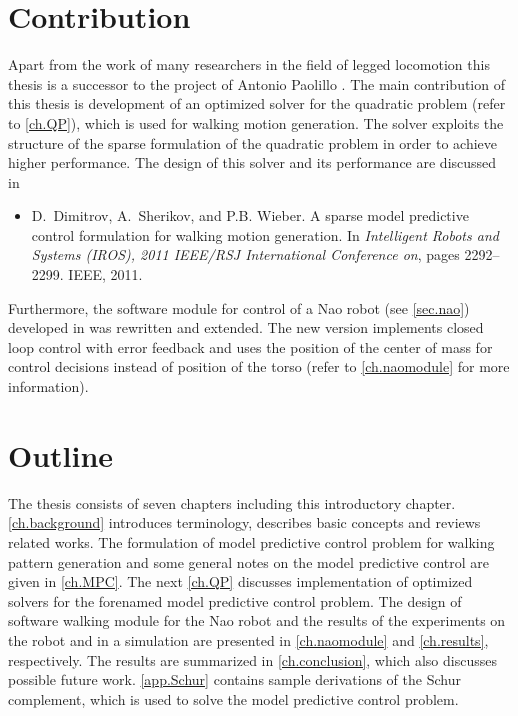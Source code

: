 \section{Contribution}
Apart from the work of many researchers in the field of legged locomotion this
thesis is a successor to the project of Antonio Paolillo \cite{AntonioThesis}. 
The main contribution of this thesis is development of an optimized solver for the 
quadratic problem (refer to \cref{ch.QP}), which is used for walking motion 
generation. The solver exploits the structure of the sparse formulation of the 
quadratic problem in order to achieve higher performance. The design of this 
solver and its performance are discussed in

\begin{itemize}
    \item D.~Dimitrov, A.~Sherikov, and P.B. Wieber.
        \newblock A sparse model predictive control formulation for walking motion
          generation.
        \newblock In {\em Intelligent Robots and Systems (IROS), 2011 IEEE/RSJ
          International Conference on}, pages 2292--2299. IEEE, 2011.
\end{itemize}

Furthermore, the software module for control of a Nao robot (see \cref{sec.nao})
developed in \cite{AntonioThesis} was rewritten and extended. The new version 
implements closed loop control with error feedback and uses the position of the 
center of mass for control decisions instead of position of the torso (refer to 
\cref{ch.naomodule} for more information).



\section{Outline}
The thesis consists of seven chapters including this introductory chapter. 
\cref{ch.background} introduces terminology, describes basic concepts and reviews 
related works. The formulation of model predictive control problem for walking 
pattern generation and some general notes on the model predictive control are 
given in \cref{ch.MPC}. The next \cref{ch.QP} discusses implementation of 
optimized solvers for the forenamed model predictive control problem. The design 
of software walking module for the Nao robot and the results of the experiments 
on the robot and in a simulation are presented in \cref{ch.naomodule} and 
\cref{ch.results}, respectively. The results are summarized in \cref{ch.conclusion},
which also discusses possible future work. \cref{app.Schur} contains sample
derivations of the Schur complement, which is used to solve the model predictive
control problem.


